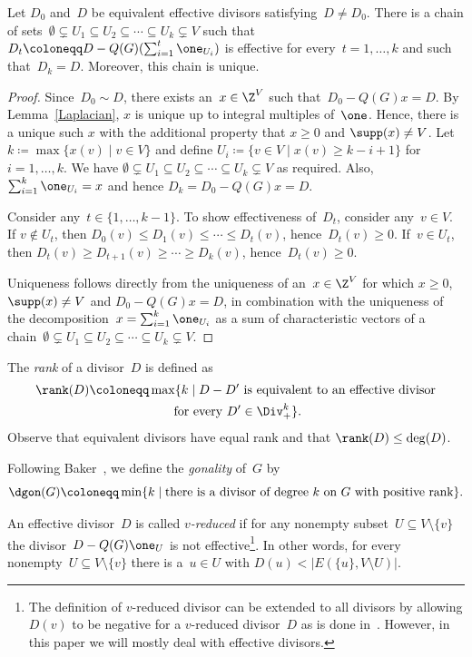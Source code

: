 \begin{lemma}\label{chain}
Let $D_0$ and~$D$ be equivalent effective divisors satisfying~$D \neq D_0$. There is a chain of sets~$\emptyset\subsetneq U_1\subseteq U_2\subseteq \cdots\subseteq U_k\subsetneq V$ such that $D_t\coloneqq D-Q(G)(\sum_{i=1}^t \one_{U_i})$ is effective for every~$t=1,\ldots,k$ and such that~$D_k=D$. Moreover, this chain is unique.
\end{lemma}
\begin{proof}
Since~$D_0\sim D$, there exists an~$x\in \Z^V$ such that~$D_0-Q(G)x=D$. By Lemma~\ref{Laplacian}, $x$ is unique up to integral multiples of~$\one$. Hence, there is a unique such $x$ with the additional property that $x\geq 0$ and $\supp(x)\neq V$. Let $k\coloneqq \max\{x(v)\mid v\in V\}$ and define $U_i\coloneqq \{v\in V\mid x(v)\geq k-i+1\}$ for $i=1,\ldots, k$. We have $\emptyset\subsetneq U_1\subseteq U_2\subseteq \cdots\subseteq U_k\subsetneq V$ as required. Also, $\sum_{i=1}^k \one_{U_i}=x$ and hence $D_k=D_0-Q(G)x=D$.

Consider any~$t\in \{1,\ldots, k-1\}$. To show effectiveness of~$D_t$, consider any~$v\in V$. If $v\not\in U_t$, then $D_0(v)\leq D_1(v)\leq \cdots\leq D_t(v)$, hence~$D_t(v)\geq 0$. If~$v\in U_t$, then $D_t(v)\geq D_{t+1}(v)\geq \cdots \geq D_k(v)$, hence~$D_t(v)\geq 0$. 

Uniqueness follows directly from the uniqueness of an~$x\in \Z^V$ for which $x\geq 0$, $\supp(x)\neq V$ and $D_0-Q(G)x=D$, in combination with the uniqueness of the decomposition~$x=\sum_{i=1}^k\one_{U_i}$ as a sum of characteristic vectors of a chain~$\emptyset\subsetneq U_1\subseteq U_2\subseteq \cdots\subseteq U_k\subsetneq V$.
\end{proof}

The \emph{rank} of a divisor~$D$ is defined as
\begin{multline}
\rank(D)\coloneqq \max\{k\mid \text{$D-D'$ is equivalent to an effective divisor}\\\text{ for every~$D'\in\Div_+^k$}\}.
\end{multline}
Observe that equivalent divisors have equal rank and that $\rank(D)\leq \deg(D)$.

Following Baker~\cite{Baker2008}, we define the \emph{gonality} of~$G$ by
\begin{equation}
\dgon(G)\coloneqq \min\{k\mid \text{there is a divisor of degree~$k$ on~$G$ with positive rank}\}.
\end{equation} 


An effective divisor~$D$ is called \emph{$v$-reduced} if for any nonempty subset~$U\subseteq V\setminus \{v\}$ the divisor~$D-Q(G)\one_U$ is not effective\footnote{The definition of $v$-reduced divisor can be extended to all divisors by allowing $D(v)$ to be negative for a $v$-reduced divisor~$D$ as is done in~\cite{BakerNorine2007}. However, in this paper we will mostly deal with effective divisors.}. In other words, for every nonempty~$U\subseteq V\setminus \{v\}$ there is a~$u\in U$ with $D(u)<|E(\{u\}, V\setminus U)|$. 

